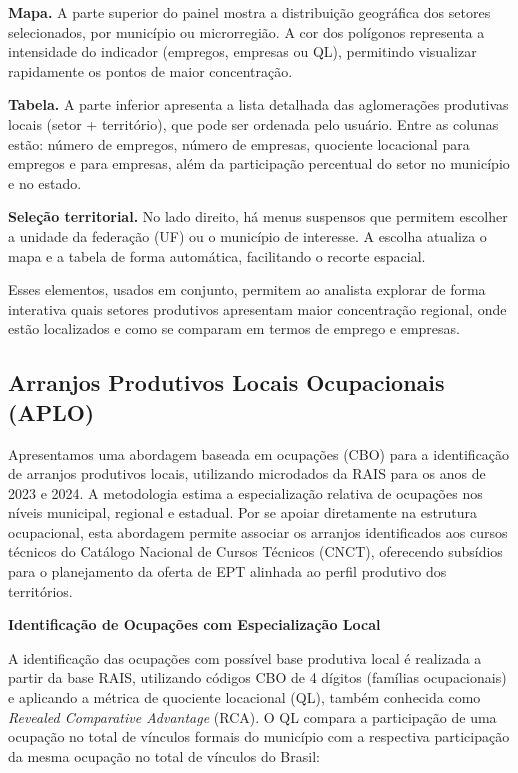 \textbf{Mapa.} A parte superior do painel mostra a distribuição geográfica dos setores 
selecionados, por município ou microrregião. A cor dos polígonos representa a 
intensidade do indicador (empregos, empresas ou QL), permitindo visualizar 
rapidamente os pontos de maior concentração.  

\textbf{Tabela.} A parte inferior apresenta a lista detalhada das aglomerações 
produtivas locais (setor + território), que pode ser ordenada pelo usuário. Entre as 
colunas estão: número de empregos, número de empresas, quociente locacional 
para empregos e para empresas, além da participação percentual do setor no 
município e no estado.  

\textbf{Seleção territorial.} No lado direito, há menus suspensos que permitem escolher 
a unidade da federação (UF) ou o município de interesse. A escolha atualiza o mapa 
e a tabela de forma automática, facilitando o recorte espacial.  

Esses elementos, usados em conjunto, permitem ao analista explorar de forma 
interativa quais setores produtivos apresentam maior concentração regional, onde 
estão localizados e como se comparam em termos de emprego e empresas.


\subsection{Arranjos Produtivos Locais Ocupacionais (APLO)}

Apresentamos uma abordagem baseada em ocupações (CBO) para a identificação de arranjos produtivos locais, utilizando microdados da RAIS para os anos de 2023 e 2024. A metodologia estima a especialização relativa de ocupações nos níveis municipal, regional e estadual. Por se apoiar diretamente na estrutura ocupacional, esta abordagem permite associar os arranjos identificados aos cursos técnicos do Catálogo Nacional de Cursos Técnicos (CNCT), oferecendo subsídios para o planejamento da oferta de EPT alinhada ao perfil produtivo dos territórios.

\textbf{Identificação de Ocupações com Especialização Local}

A identificação das ocupações com possível base produtiva local é realizada a partir da base RAIS, utilizando códigos CBO de 4 dígitos (famílias ocupacionais) e aplicando a métrica de quociente locacional (QL), também conhecida como \textit{Revealed Comparative Advantage} (RCA). O QL compara a participação de uma ocupação no total de vínculos formais do município com a respectiva participação da mesma ocupação no total de vínculos do Brasil:

